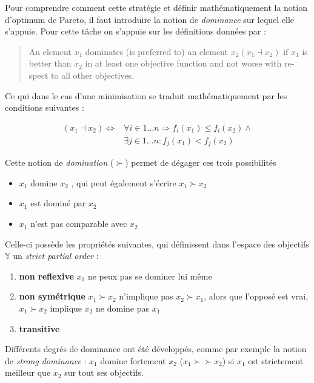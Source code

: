 Pour comprendre comment cette stratégie et définir mathématiquement la notion d'optimum de Pareto, il faut introduire la notion de \textit{dominance} sur lequel elle s'appuie. Pour cette tâche on s'appuie sur les définitions données par \textcite[65]{Weise2011} :

\foreignblockquote{english}[{\cite[65]{Weise2011}}]{An element $x_1$ dominates (is preferred to) an element $x_2 (x_1 \dashv x_2)$ if $x_1$ is better than $x_2$ in at least one objective function and not worse with respect to all other objectives.}

Ce qui dans le cas d'une minimisation se traduit mathématiquement par les conditions suivantes :

\begin{align*}
	(x_1 \dashv x_2) \Leftrightarrow &\forall i \in 1 \dotsc n \Rightarrow  f_i (x_1) \leq f_i (x_2) \land \\
	&\exists j \in 1 \dotsc n : f_j (x_1) < f_j (x_2)
\end{align*}

Cette notion de \textit{domination} ($\succ$)  permet de dégager ces trois possibilités

\begin{itemize}
\item $x_1$ domine $x_2$ , qui peut également s'écrire $x_1 \succ x_2$
\item $x_1$ est dominé par $x_2$
\item $x_1$ n'est pas comparable avec $x_2$
\end{itemize}

Celle-ci possède les propriétés suivantes, qui définissent dans l'espace des objectifs $\mathbb{Y}$ un \textit{strict partial order} :

\begin{enumerate}
\item{\textbf{non reflexive}}  $x_1$ ne peux pas se dominer lui même
\item{\textbf{non symétrique}} $ x_1 \succ x_2$ n'implique pas $x_2 \succ x_1$, alors que l'opposé est vrai, $x_1 \succ x_2$ implique $x_2$ ne domine pas $x_1$
\item{\textbf{transitive} }
\end{enumerate}

Différents degrés de dominance ont été développés, comme par exemple la notion de \textit{strong dominance} : $x_1$ domine fortement $x_2$ ($x_1 \succ \succ x_2$) si $x_1$ est strictement meilleur que $x_2$ sur tout ses objectifs.

